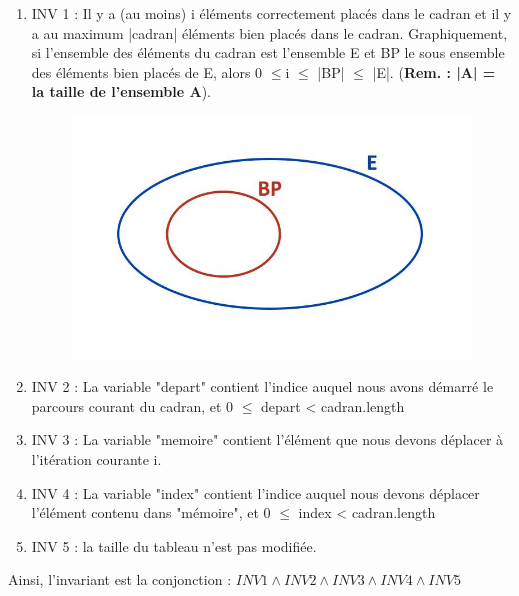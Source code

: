 \documentclass[a4paper, 12pt]{article}
\begin{document}
\vspace{0.2cm}

\begin{enumerate}
\item INV 1 : Il y a (au moins) i éléments correctement placés dans le cadran et il y a au maximum |cadran| éléments bien placés dans le cadran.
Graphiquement, si l'ensemble des éléments du cadran est l'ensemble E et BP le sous ensemble des éléments bien placés de E, alors 0 $\le$i $\le$ |BP| $\le$ |E|. (\textbf{Rem. : |A| = la taille de l'ensemble A}).\\

\begin{figure}[h]
   \includegraphics[scale=0.5]{Ensembles}
\end{figure}


\item INV 2 : La variable "depart" contient l'indice auquel nous avons démarré le parcours courant du cadran, et 0 $\le$ depart < cadran.length

\item INV 3 : La variable "memoire" contient l'élément que nous devons déplacer à l'itération courante i.

\item INV 4 : La variable "index" contient l'indice auquel nous devons déplacer l'élément contenu dans "mémoire", et 0 $\le$ index < cadran.length

\item INV 5 : la taille du tableau n'est pas modifiée.
\end{enumerate}

Ainsi, l'invariant est la conjonction : $INV 1 \wedge INV 2 \wedge INV 3 \wedge INV 4 \wedge INV 5$
\end{document}
